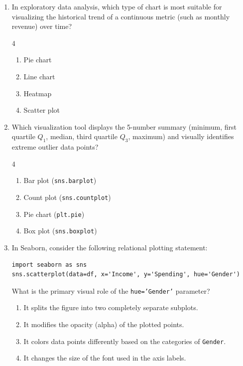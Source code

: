 \documentclass[11pt,a4paper]{article}
\begin{document}
\newpage
\begin{enumerate}[leftmargin=*,itemsep=2.5pt,resume]

\item In exploratory data analysis, which type of chart is most suitable for visualizing the historical trend of a continuous metric (such as monthly revenue) over time?
\begin{multicols}{4}
\begin{enumerate}[label=\Alph*.]
  \item Pie chart
  \item Line chart
  \item Heatmap
  \item Scatter plot
\end{enumerate}
\end{multicols}

\item Which visualization tool displays the 5-number summary (minimum, first quartile $Q_1$, median, third quartile $Q_3$, maximum) and visually identifies extreme outlier data points?
\begin{multicols}{4}
\begin{enumerate}[label=\Alph*.]
  \item Bar plot (\texttt{sns.barplot})
  \item Count plot (\texttt{sns.countplot})
  \item Pie chart (\texttt{plt.pie})
  \item Box plot (\texttt{sns.boxplot})
\end{enumerate}
\end{multicols}

\item In Seaborn, consider the following relational plotting statement:
\begin{lstlisting}
import seaborn as sns
sns.scatterplot(data=df, x='Income', y='Spending', hue='Gender')
\end{lstlisting}
What is the primary visual role of the \texttt{hue='Gender'} parameter?
\begin{enumerate}[label=\Alph*.]
  \item It splits the figure into two completely separate subplots.
  \item It modifies the opacity (alpha) of the plotted points.
  \item It colors data points differently based on the categories of \texttt{Gender}.
  \item It changes the size of the font used in the axis labels.
\end{enumerate}


\end{enumerate}
\end{document}
